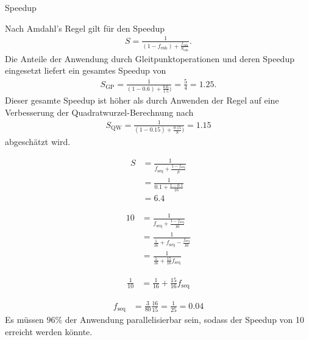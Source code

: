 \documentclass[
ngerman,
subtask=ruled %
]{tudaexercise}
\begin{document}
	
	\begin{task}{Speedup} 
		\begin{subtask}[title=]
			Nach Amdahl's Regel gilt für den Speedup
			\begin{align}
				S = \frac{1}{(1-f_\text{enh}) + \frac{f_\text{enh}}{S_\text{enh}}}.
			\end{align}
			Die Anteile der Anwendung durch Gleitpunktoperationen und deren Speedup eingesetzt liefert ein gesamtes Speedup von
			\begin{align}
				S_\text{GP} = \frac{1}{(1-0.6) + \frac{0.6}{1.5})} = \frac{5}{4} = 1.25 \text{.}
			\end{align}
			Dieser gesamte Speedup ist höher als durch Anwenden der Regel auf eine Verbesserung der Quadratwurzel-Berechnung nach
			\begin{align}
				S_\text{QW} = \frac{1}{(1-0.15) + \frac{0.15}{8})} = 1.15
			\end{align}
			abgeschätzt wird.
			
		\end{subtask}
		\begin{subtask}[title=]
			\begin{align}
				S &= \frac{1}{f_\text{seq} + \frac{1-f_\text{seq}}{p}} \\
				&= \frac{1}{0.1 + \frac{1-0.1}{16}} \\
				&= 6.4
			\end{align}
		\end{subtask}
		\begin{subtask}[title=]
			\begin{align}
				10 &= \frac{1}{f_\text{seq} + \frac{1-f_\text{seq}}{16}} \\
				&= \frac{1}{\frac{1}{16} + f_\text{seq} - \frac{f_\text{seq}}{16}} \\
				&= \frac{1}{\frac{1}{16} + \frac{15}{16} f_\text{seq}}
			\end{align}
			
			\begin{align}
				\frac{1}{10} &= \frac{1}{16} + \frac{15}{16} f_\text{seq}
			\end{align}
			
			\begin{align}
				f_\text{seq} &= \frac{3}{80} \frac{16}{15} = \frac{1}{25} = 0.04
			\end{align}
			Es müssen $96\%$ der Anwendung parallelisierbar sein, sodass der Speedup von 10 erreicht werden könnte.
		\end{subtask}
	\end{task}
	
\end{document}
